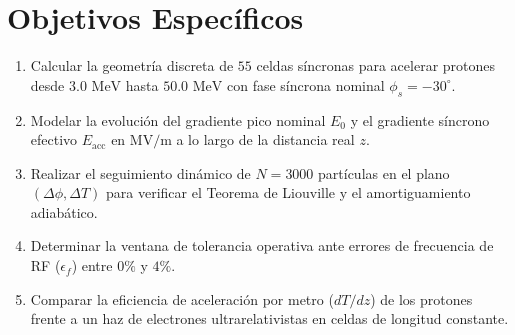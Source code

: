 \section*{Objetivos Específicos}
\begin{enumerate}
    \item Calcular la geometría discreta de $55$ celdas síncronas para acelerar protones desde $3.0\text{ MeV}$ hasta $50.0\text{ MeV}$ con fase síncrona nominal $\phi_s = -30^\circ$.
    \item Modelar la evolución del gradiente pico nominal $E_0$ y el gradiente síncrono efectivo $E_{\text{acc}}$ en $\text{MV/m}$ a lo largo de la distancia real $z$.
    \item Realizar el seguimiento dinámico de $N = 3000$ partículas en el plano $(\Delta\phi, \Delta T)$ para verificar el Teorema de Liouville y el amortiguamiento adiabático.
    \item Determinar la ventana de tolerancia operativa ante errores de frecuencia de RF ($\epsilon_f$) entre $0\%$ y $4\%$.
    \item Comparar la eficiencia de aceleración por metro ($dT/dz$) de los protones frente a un haz de electrones ultrarelativistas en celdas de longitud constante.
\end{enumerate}
    
